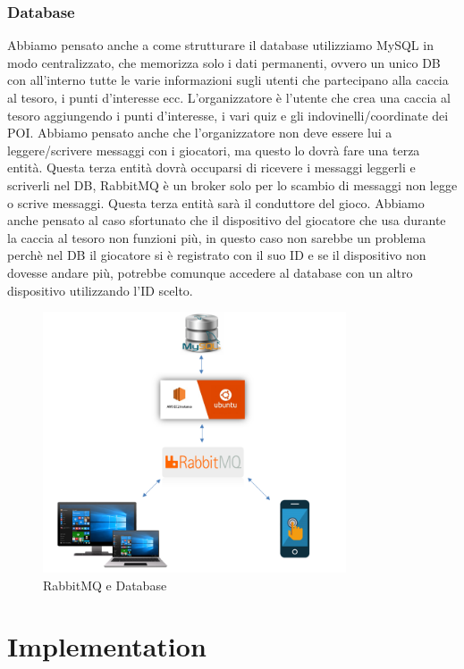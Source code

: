 \documentclass[12pt, italian]{article}
\begin{document}
\subsubsection{Database}
Abbiamo pensato anche a come strutturare il database utilizziamo MySQL in modo centralizzato, che memorizza solo i dati permanenti, ovvero un unico DB con all'interno tutte le varie informazioni sugli utenti che partecipano alla caccia al tesoro, i punti d'interesse ecc. L'organizzatore è l'utente che crea una caccia al tesoro aggiungendo i punti d'interesse, i vari quiz e gli indovinelli/coordinate dei POI. Abbiamo pensato anche che l'organizzatore non deve essere lui a leggere/scrivere messaggi con i giocatori, ma questo lo dovrà fare una terza entità. Questa terza entità dovrà occuparsi di ricevere i messaggi leggerli e scriverli nel DB, RabbitMQ è un broker solo per lo scambio di messaggi non legge o scrive messaggi. Questa terza entità  sarà il conduttore del gioco. Abbiamo anche pensato al caso sfortunato che il dispositivo del giocatore che usa durante la caccia al tesoro non funzioni più, in questo caso non sarebbe un problema perchè nel DB il giocatore si è registrato con il suo ID e se il dispositivo non dovesse andare più, potrebbe comunque accedere al database con un altro dispositivo utilizzando l'ID scelto.

\begin{figure}[H]
	\centering
	\includegraphics[width=0.8\textwidth]{img/rabbit.png}
	\caption{RabbitMQ e Database}
\end{figure}

\section{Implementation}
\end{document}
